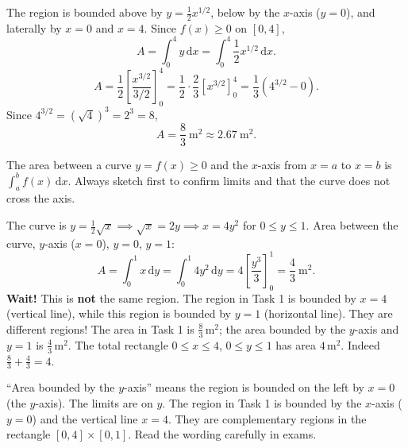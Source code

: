 \documentclass[11pt]{article}
\newcounter{popsec}
\newcounter{popsub}
\newcommand{\courssub}[1]{%
  \stepcounter{popsub}%
  \par\vspace{9pt}\noindent{\popxbold\fontsize{11.5}{13}\selectfont\color{popink}{\color{poporange}\thepopsec.\thepopsub}\hspace{6pt}#1}\par\nopagebreak\vspace{4pt}
}
\begin{document}
\courssub{Model Answer}

\begin{exoresolu}
The region is bounded above by $y = \frac{1}{2}x^{1/2}$, below by the $x$-axis ($y=0$), and laterally by $x=0$ and $x=4$. Since $f(x)\ge 0$ on $[0,4]$,
\[
A = \int_{0}^{4} y\,\mathrm{d}x = \int_{0}^{4} \frac{1}{2}x^{1/2}\,\mathrm{d}x.
\]
\[
A = \frac{1}{2} \left[ \frac{x^{3/2}}{3/2} \right]_{0}^{4} = \frac{1}{2} \cdot \frac{2}{3} \left[ x^{3/2} \right]_{0}^{4} = \frac{1}{3} \left( 4^{3/2} - 0 \right).
\]
Since $4^{3/2} = (\sqrt{4})^3 = 2^3 = 8$,
\[
A = \frac{8}{3}\ \mathrm{m}^2 \approx 2.67\ \mathrm{m}^2.
\]
\end{exoresolu}

\begin{aretenir}
The area between a curve $y=f(x)\ge 0$ and the $x$-axis from $x=a$ to $x=b$ is $\int_a^b f(x)\,\mathrm{d}x$. Always sketch first to confirm limits and that the curve does not cross the axis.
\end{aretenir}

\begin{exoresolu}
The curve is $y = \frac{1}{2}\sqrt{x} \implies \sqrt{x} = 2y \implies x = 4y^2$ for $0\le y\le 1$.
Area between the curve, $y$-axis ($x=0$), $y=0$, $y=1$:
\[
A = \int_{0}^{1} x\,\mathrm{d}y = \int_{0}^{1} 4y^2\,\mathrm{d}y = 4\left[ \frac{y^3}{3} \right]_0^1 = \frac{4}{3}\ \mathrm{m}^2.
\]
\textbf{Wait!} This is \textbf{not} the same region. The region in Task 1 is bounded by $x=4$ (vertical line), while this region is bounded by $y=1$ (horizontal line). They are different regions! The area in Task 1 is $\frac{8}{3}\,\mathrm{m}^2$; the area bounded by the $y$-axis and $y=1$ is $\frac{4}{3}\,\mathrm{m}^2$. The total rectangle $0\le x\le 4$, $0\le y\le 1$ has area $4\,\mathrm{m}^2$. Indeed $\frac{8}{3} + \frac{4}{3} = 4$.
\end{exoresolu}

\begin{attention}
``Area bounded by the $y$-axis'' means the region is bounded on the left by $x=0$ (the $y$-axis). The limits are on $y$. The region in Task 1 is bounded by the $x$-axis ($y=0$) and the vertical line $x=4$. They are complementary regions in the rectangle $[0,4]\times[0,1]$. Read the wording carefully in exams.
\end{attention}
\end{document}
